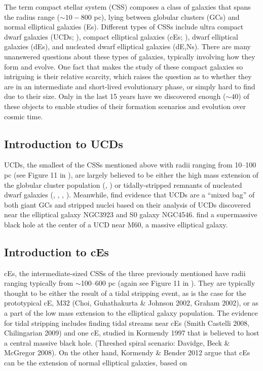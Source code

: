 \documentclass[iop,apj,twocolappendix]{emulateapj}
\begin{document}
\noindent The term compact stellar system (CSS) composes a class of galaxies that spans the radius range ($\sim10 - 800$ pc), lying between globular clusters (GCs) and normal elliptical galaxies (Es). Different types of CSSs include ultra compact dwarf galaxies (UCDs; \cite{Phillipps2001}), compact elliptical galaxies (cEs; \cite{Faber1973}), dwarf elliptical galaxies (dEs), and nucleated dwarf elliptical galaxies (dE,Ns).  There are many unanswered questions about these types of galaxies, typically involving how they form and evolve. One fact that makes the study of these compact galaxies so intriguing is their relative scarcity, which raises the question as to whether they are in an intermediate and short-lived evolutionary phase, or simply hard to find due to their size. Only in the last 15 years have we discovered enough ($\sim 40$) of these objects to enable studies of their formation scenarios and evolution over cosmic time.

\subsection{Introduction to UCDs}
UCDs, the smallest of the CSSs mentioned above with radii ranging from 10--100 pc (see Figure 11 in \cite{Norris2014}), are largely believed to be either the high mass extension of the globular cluster population (\cite{Drinkwater2000}, \cite{Mieske2002}) or tidally-stripped remnants of nucleated dwarf galaxies (\cite{Bekki2001}, \cite{Bekki2003}, \cite{Jennings2015}, \cite{Zhang2015}). Meanwhile, \cite{Norris2011} find evidence that UCDs are a ``mixed bag'' of both giant GCs and stripped nuclei based on their analysis of UCDs discovered near the elliptical galaxy NGC3923 and S0 galaxy NGC4546. \cite{Seth2014} find a supermassive black hole at the center of a UCD near M60, a massive elliptical galaxy. 
 
 \subsection{Introduction to cEs}
cEs, the intermediate-sized CSSs of the three previously mentioned have radii ranging typically from $\sim$100--600 pc (again see Figure 11 in \cite{Norris2014}). They are typically thought to be either the result of a tidal stripping event, as is the case for the prototypical cE, M32 (Choi, Guhathakurta \& Johnson 2002, Graham 2002), or as a part of the low mass extension to the elliptical galaxy population. The evidence for tidal stripping includes finding tidal streams near cEs (Smith Castelli 2008, Chilingarian 2009) and one cE, studied in Kormendy 1997 that is believed to host a central massive black hole. (Threshed spiral scenario: Davidge, Beck \& McGregor 2008). On the other hand, Kormendy \& Bender 2012 argue that cEs can be the extension of normal elliptical galaxies, based on 
\end{document}
